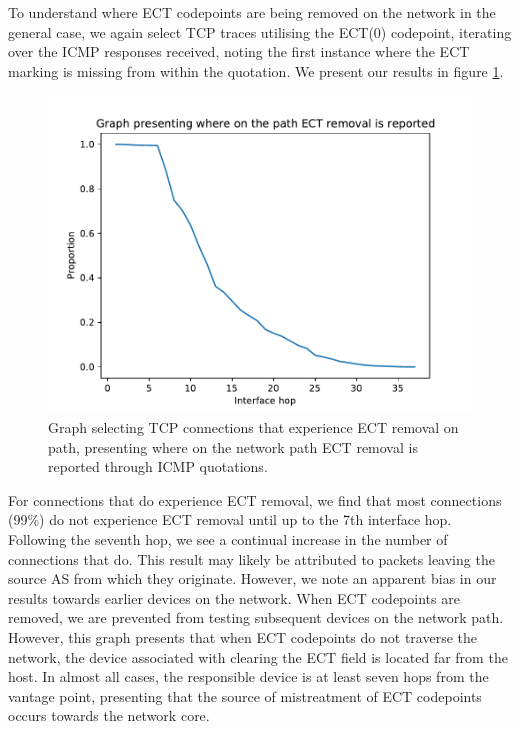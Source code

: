 \documentclass{l4proj}
\begin{document}
To understand where ECT codepoints are being removed on the network in the general case, we again select TCP traces utilising the ECT(0) codepoint, iterating over the ICMP responses received, noting the first instance where the ECT marking is missing from within the quotation. We present our results in figure \ref{fig:tcppreserve}.

\begin{figure}[H]
    \centering
    \includegraphics[scale=0.70]{dissertation/images/preservetcp.pdf}
    \caption{Graph selecting TCP connections that experience ECT removal on path, presenting where on the network path ECT removal is reported through ICMP quotations.}
    \label{fig:tcppreserve}
\end{figure}

For connections that do experience ECT removal, we find that most connections (99\%) do not experience ECT removal until up to the 7th interface hop. Following the seventh hop, we see a continual increase in the number of connections that do. This result may likely be attributed to packets leaving the source AS from which they originate. However, we note an apparent bias in our results towards earlier devices on the network. When ECT codepoints are removed, we are prevented from testing subsequent devices on the network path. However, this graph presents that when ECT codepoints do not traverse the network, the device associated with clearing the ECT field is located far from the host. In almost all cases, the responsible device is at least seven hops from the vantage point, presenting that the source of mistreatment of ECT codepoints occurs towards the network core.
\end{document}
